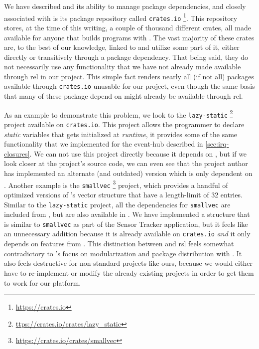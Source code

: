 We have described {\cargo} and its ability to manage package dependencies, and closely associated with {\cargo} is its package repository called \texttt{crates.io} \footnote{\url{https://crates.io}}.
This repository stores, at the time of this writing, a couple of thousand different {\rust} crates, all made available for anyone that builds {\rust} programs with {\cargo}.
The vast majority of these crates are, to the best of our knowledge, linked to {\std} and utilize some part of it, either directly or transitively through a package dependency.
That being said, they do not necessarily use any functionality that we have not already made available through \gls{rel} in our project.
This simple fact renders nearly all (if not all) packages available through \texttt{crates.io} unusable for our project, even though the same basis that many of these package depend on might already be available through \gls{rel}.

As an example to demonstrate this problem, we look to the \texttt{lazy-static} \footnote{\url{ttps://crates.io/crates/lazy_static}} project available on \texttt{crates.io}.
This project allows the programmer to declare \emph{static} variables that gets initialized at \emph{runtime}, it provides some of the same functionality that we implemented for the event-hub described in \autoref{sec:irq-closures}.
We can not use this project directly because it depends on {\std}, but if we look closer at the project's source code, we can even see that the project author has implemented an alternate (and outdated) version which is only dependent on {\core}.
Another example is the \texttt{smallvec} \footnote{\url{https://crates.io/crates/smallvec}} project, which provides a handful of optimized versions of {\rust}'s vector structure that have a length-limit of 32 entries.
Similar to the \texttt{lazy-static} project, all the dependencies for \texttt{smallvec} are included from {\std}, but are also available in {\core}.
We have implemented a structure that is similar to \texttt{smallvec} as part of the Sensor Tracker application, but it feels like an unnecessary addition because it is already available on \texttt{crates.io} \emph{and} it only depends on features from {\core}.
This distinction between {\std} and \gls{rsl} feels somewhat contradictory to {\rust}'s focus on modularization and package distribution with {\cargo}.
It also feels destructive for non-standard projects like ours, because we would either have to re-implement or modify the already existing projects in order to get them to work for our platform.